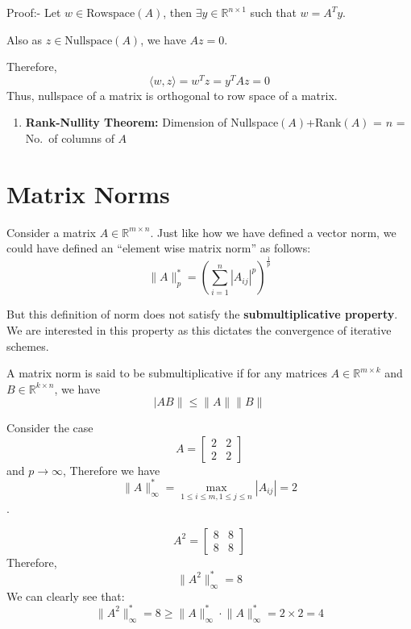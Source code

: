 \documentclass[
]{book}
\providecommand{\tightlist}{%
  \setlength{\itemsep}{0pt}\setlength{\parskip}{0pt}}
\begin{document}
Proof:- Let \(w \in \text{Rowspace}(A)\), then \(\exists y\in\mathbb{R}^{n\times 1}\) such that \(w = A^Ty\).

Also as \(z\in \text{Nullspace}(A)\), we have \(Az=0\).

Therefore,
\[\langle w,z\rangle = w^Tz = y^T Az = 0\]
Thus, nullspace of a matrix is orthogonal to row space of a matrix.

\begin{enumerate}
\def\labelenumi{\arabic{enumi}.}
\setcounter{enumi}{4}
\tightlist
\item
  \textbf{Rank-Nullity Theorem:} Dimension of Nullspace\((A)\)+Rank\((A)\) = \(n\) = No.~of columns of \(A\)
\end{enumerate}

\hypertarget{matrix-norms}{%
\section{Matrix Norms}\label{matrix-norms}}

Consider a matrix \(A\in\mathbb{R}^{m\times n}\). Just like how we have defined a vector norm, we could have defined an ``element wise matrix norm'' as follows:
\begin{equation}
\lVert A \rVert_p^* = \left(\sum_{i=1}^n |A_{ij}|^p\right)^{\frac{1}{p}} 
\end{equation}

But this definition of norm does not satisfy the \textbf{submultiplicative property}. We are interested in this property as this dictates the convergence of iterative schemes.

A matrix norm is said to be submultiplicative if for any matrices \(A\in \mathbb{R}^{m\times k}\) and \(B \in \mathbb{R}^{k\times n}\), we have
\begin{equation}
\lvert AB \rVert \le \lVert A \rVert  \lVert B \rVert
\end{equation}

Consider the case \[A = \begin{bmatrix} 2&2\\2&2 \end{bmatrix}\] and \(p\to \infty\), Therefore we have \[ \lVert A \rVert_{\infty}^* = \max_{1\le i \le m,1 \le j \le n} |A_{ij}| = 2\].

\[A^2 = \begin{bmatrix} 8 & 8\\ 8& 8 \end{bmatrix}\]
Therefore,
\[\lVert A^2 \rVert_{\infty}^* = 8\]
We can clearly see that:
\[\lVert A^2 \rVert_{\infty}^* = 8 \ge \lVert A \rVert_{\infty}^* \cdot \lVert A \rVert_{\infty}^* = 2 \times 2 = 4\]
\end{document}
